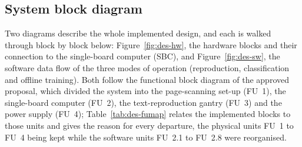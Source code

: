 \subsection{System block diagram}
\label{sec:blockdiagram}

Two diagrams describe the whole implemented design, and each is walked through block by block below: Figure~\ref{fig:des-hw}, the hardware blocks and their connection to the single-board computer (SBC), and Figure~\ref{fig:des-sw}, the software data flow of the three modes of operation (reproduction, classification and offline training).
Both follow the functional block diagram of the approved proposal, which divided the system into the page-scanning set-up (FU~1), the single-board computer (FU~2), the text-reproduction gantry (FU~3) and the power supply (FU~4); Table~\ref{tab:des-fumap} relates the implemented blocks to those units and gives the reason for every departure, the physical units FU~1 to FU~4 being kept while the software units FU~2.1 to FU~2.8 were reorganised.

